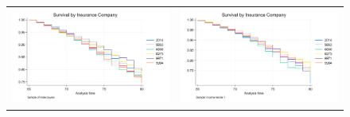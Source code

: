 \documentclass[12pt]{article}
\begin{document}
\begin{figure}[H]
\caption{}
\label{fig:ie6_3}
\centering{}%
\begin{tabular}{cc}
\includegraphics[scale=0.25]{../figures/IE6/IE6_survival_year_males.png} & \includegraphics[scale=0.25]{../figures/IE6/IE6_survival_year_income1.png} 
\end{tabular}
\end{figure}
\end{document}
